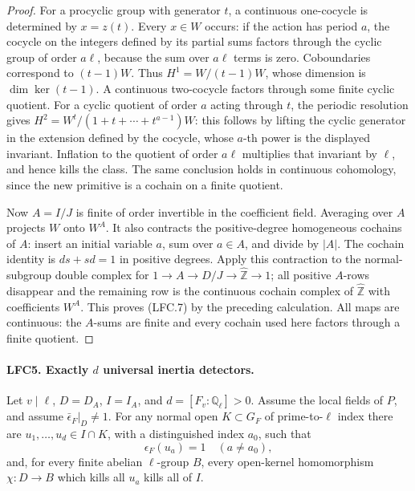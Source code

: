 \documentclass[11pt,a4paper]{article}
\numberwithin{equation}{section}
\theoremstyle{remark}\newtheorem{remark}[theorem]{Remark}
\begin{document}
\begin{proof}
For a procyclic group with generator \(t\), a continuous
one-cocycle is determined by \(x=z(t)\).
Every \(x\in W\) occurs: if the action has period \(a\),
the cocycle on the integers defined by its partial sums
factors through the cyclic group of order \(a\ell\), because
the sum over \(a\ell\) terms is zero.
Coboundaries correspond to \((t-1)W\).  Thus
\(H^1=W/(t-1)W\), whose dimension is \(\dim\ker(t-1)\).
A continuous two-cocycle factors through some finite cyclic
quotient.  For a cyclic quotient of order \(a\) acting through
\(t\), the periodic resolution gives
\(H^2=W^t/(1+t+\cdots+t^{a-1})W\): this follows by lifting
the cyclic generator in the extension defined by the cocycle,
whose \(a\)-th power is the displayed invariant.
Inflation to the quotient of order \(a\ell\) multiplies that
invariant by \(\ell\), and hence kills the class.
The same conclusion holds in continuous cohomology, since
the new primitive is a cochain on a finite quotient.

Now \(A=I/J\) is finite of order invertible in the coefficient
field.  Averaging over \(A\) projects \(W\) onto \(W^A\).
It also contracts the positive-degree homogeneous cochains
of \(A\): insert an initial variable \(a\), sum over \(a\in A\),
and divide by \(|A|\).  The cochain identity is \(ds+sd=1\)
in positive degrees.  Apply this contraction to the
normal-subgroup double complex for
\(1\to A\to D/J\to\widehat{\mathbb Z}\to1\);
all positive \(A\)-rows disappear and the remaining row is
the continuous cochain complex of
\(\widehat{\mathbb Z}\) with coefficients \(W^A\).
This proves (LFC.7) by the preceding calculation.
All maps are continuous: the \(A\)-sums are finite and every
cochain used here factors through a finite quotient.
\end{proof}

\paragraph{LFC5. Exactly \(d\) universal inertia detectors.}
\label{claim:LFC5}
Let \(v\mid\ell\), \(D=D_A\), \(I=I_A\), and
\(d=[F_v:\mathbb Q_\ell]>0\).  Assume the local fields of
\(P\), and assume \(\bar\epsilon_F|_D\ne1\).
For any normal open \(K\subset G_F\) of prime-to-\(\ell\)
index there are \(u_1,\ldots,u_d\in I\cap K\), with a
distinguished index \(a_0\), such that
\[
 \epsilon_F(u_a)=1\quad(a\ne a_0),                       \tag{LFC.8}
\]
and, for every finite abelian \(\ell\)-group \(B\), every
open-kernel homomorphism \(\chi:D\to B\) which kills all
\(u_a\) kills all of \(I\).
\end{document}
